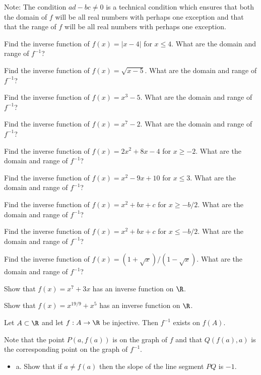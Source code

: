 \begin{theorem}
\begin{theorem}
\begin{theorem}
\begin{theorem}
\begin{theorem}
\begin{exercises}
\item{}
Note: The condition $ad-bc \neq 0 $ is a technical condition which
ensures that both the domain of $f$  will be all real numbers with
perhaps one exception and that that the range of $f$ will be all
real numbers with perhaps one exception.

\exercise Find the inverse function of $f(x) =|x-4|$ for
$x\leq4$. What are the domain and range of $f^{-1}$?

\exercise Find the inverse function of $f(x) = \sqrt{x-5}$. 
What are the domain and range of $f^{-1}$?

\exercise Find the inverse function of $f(x) = x^3 - 5$.  What are the
domain and range of $f^{-1}$?

\exercise Find the inverse function of $f(x) =x^7 - 2$. What are the
domain and range of $f^{-1}$?

\exercise Find the inverse function of $f(x) =2x^2 +8x - 4 $ for
$x\geq -2 $. What are the domain and range of $f^{-1 } $? 

\exercise Find the inverse function of $f(x) =x^2 -9x + 10 $ for
$x\leq 3 $.  What are the domain and range of $f^{-1 } $?  

\exercise Find the inverse function of $f(x)= x^2 +bx+ c$ for $x\geq
-b/2$. What are the domain and range of $f^{-1 } $?

\exercise Find the inverse function of $f(x)= x^2 +bx+ c$ for
$x\leq -b/2$. What are the domain and range of $f^{-1}$?

\exercise Find the inverse function of $f(x) =
(1+\sqrt{x})/(1-\sqrt{x})$. What are the domain and range of $f^{-1 }$?

\exercise Show that $f(x) =x^7 + 3x $ has an inverse
function on $\R$.

\exercise Show that $f(x) =x^{19/9} +x^5 $ has an inverse
function on $\R$. 

\exercise\label{exer:reflection} 
Let $A\subset \R$ and let $f: A\to\R$ be
injective.  Then $f^{-1}$ exists on $f(A)$.

\item{}
Note that the point $P(a, f(a)) $ is on the graph of $f$ and that
$Q(f(a), a) $ is the corresponding point on the graph of $f^{-1} $.
\label{exer:inverse is reflection}
\begin{itemize} %

\item{a.} Show that if $a\neq f(a)$ then the slope of the line segment
$PQ$ is $-1 $.


\end{itemize}
\end{exercises}
\end{theorem}
\end{theorem}
\end{theorem}
\end{theorem}
\end{theorem}
